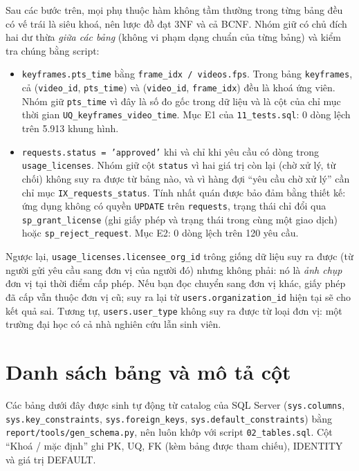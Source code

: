 Sau các bước trên, mọi phụ thuộc hàm không tầm thường trong từng bảng đều có vế trái là
siêu khoá, nên lược đồ đạt 3NF và cả BCNF. Nhóm giữ có chủ đích hai dư thừa \textit{giữa các
bảng} (không vi phạm dạng chuẩn của từng bảng) và kiểm tra chúng bằng script:
\begin{itemize}
    \item \texttt{keyframes.pts\_time} bằng \texttt{frame\_idx / videos.fps}. Trong bảng
    \texttt{keyframes}, cả (\texttt{video\_id}, \texttt{pts\_time}) và (\texttt{video\_id},
    \texttt{frame\_idx}) đều là khoá ứng viên. Nhóm giữ \texttt{pts\_time} vì đây là số đo gốc
    trong dữ liệu và là cột của chỉ mục thời gian \texttt{UQ\_keyframes\_video\_time}. Mục E1
    của \texttt{11\_tests.sql}: 0 dòng lệch trên 5.913 khung hình.
    \item \texttt{requests.status = 'approved'} khi và chỉ khi yêu cầu có dòng trong
    \texttt{usage\_licenses}. Nhóm giữ cột \texttt{status} vì hai giá trị còn lại (chờ xử lý,
    từ chối) không suy ra được từ bảng nào, và vì hàng đợi ``yêu cầu chờ xử lý'' cần chỉ mục
    \texttt{IX\_requests\_status}. Tính nhất quán được bảo đảm bằng thiết kế: ứng dụng không có
    quyền \texttt{UPDATE} trên \texttt{requests}, trạng thái chỉ đổi qua
    \texttt{sp\_grant\_license} (ghi giấy phép và trạng thái trong cùng một giao dịch) hoặc
    \texttt{sp\_reject\_request}. Mục E2: 0 dòng lệch trên 120 yêu cầu.
\end{itemize}

Ngược lại, \texttt{usage\_licenses.licensee\_org\_id} trông giống dữ liệu suy ra được (từ
người gửi yêu cầu sang đơn vị của người đó) nhưng không phải: nó là \textit{ảnh chụp} đơn vị
tại thời điểm cấp phép. Nếu bạn đọc chuyển sang đơn vị khác, giấy phép đã cấp vẫn thuộc đơn
vị cũ; suy ra lại từ \texttt{users.organization\_id} hiện tại sẽ cho kết quả sai. Tương tự,
\texttt{users.user\_type} không suy ra được từ loại đơn vị: một trường đại học có cả nhà
nghiên cứu lẫn sinh viên.

\section{Danh sách bảng và mô tả cột}

Các bảng dưới đây được sinh tự động từ catalog của SQL Server (\texttt{sys.columns},
\texttt{sys.key\_constraints}, \texttt{sys.foreign\_keys}, \texttt{sys.default\_constraints})
bằng \texttt{report/tools/gen\_schema.py}, nên luôn khớp với script \texttt{02\_tables.sql}.
Cột ``Khoá / mặc định'' ghi PK, UQ, FK (kèm bảng được tham chiếu), IDENTITY và giá trị
DEFAULT.

